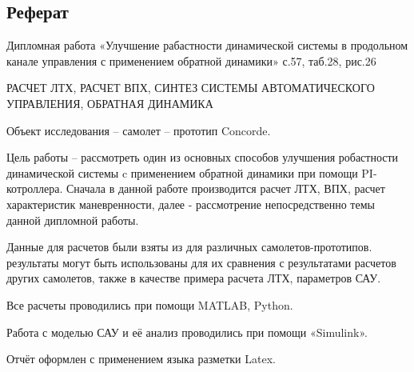 
\newpage
\begin{center}
    \section*{Реферат}
\end{center}
\pagestyle{fancy}
\fancyhf{}
\rfoot{\thepage}
Дипломная работа «Улучшение рабастности динамической системы в продольном канале управления с применением обратной динамики»  с.57, таб.28, рис.26

РАСЧЕТ ЛТХ, РАСЧЕТ ВПХ, СИНТЕЗ СИСТЕМЫ АВТОМАТИЧЕСКОГО
УПРАВЛЕНИЯ, ОБРАТНАЯ ДИНАМИКА

Объект исследования -- самолет -- прототип Concorde.

Цель работы -- рассмотреть один из основных способов улучшения робастности динамической системы c применением обратной динамики при помощи PI-котроллера. Сначала в данной работе производится расчет ЛТХ, ВПХ, расчет
характеристик маневренности, далее - 
рассмотрение непосредственно темы данной дипломной работы.

Данные для расчетов были взяты из \cite{Album} для различных самолетов-прототипов.
 результаты могут быть использованы для их сравнения с
результатами расчетов других самолетов, также в качестве примера расчета
ЛТХ, параметров САУ.

Все расчеты проводились при помощи MATLAB, Python. 

Работа с моделью САУ и её анализ проводились при помощи «Simulink». 

Отчёт оформлен с применением языка разметки Latex.
 